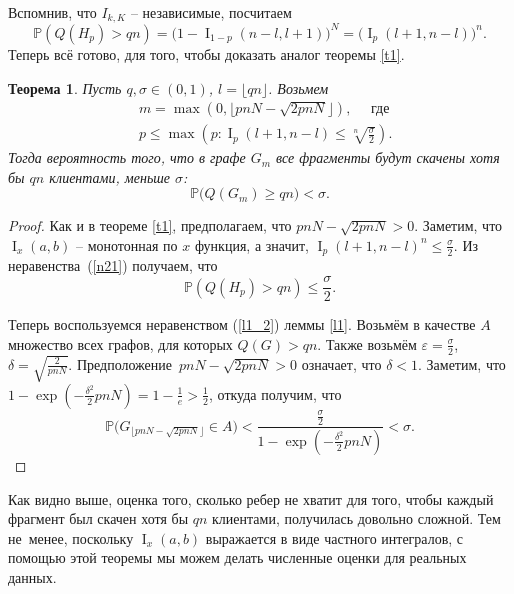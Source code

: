 \documentclass{matmex-diploma-custom}
\newcommand{\PRob}{\mathbb P}
\newcommand{\leqs}{\leqslant}
\newcommand{\geqs}{\geqslant}
\newcommand{\eps}{\varepsilon}
\DeclareMathOperator{\I}{I}
\newtheorem{theorem}{Теорема}
\theoremstyle{named}
\begin{document}
Вспомнив, что $I_{k,K}$ -- независимые, посчитаем
\begin{equation}\label{n21}
\PRob(Q(H_p) > qn) = \big(1 - \I_{1-p}(n-l, l+1)\big)^N = \big(\I_{p}(l+1, n-l)\big)^n.
\end{equation}
Теперь всё готово, для того, чтобы доказать аналог теоремы \ref{t1}.

\begin{theorem}\label{t2}
Пусть $q, \sigma \in (0, 1)$, $l = \lfloor qn \rfloor$. Возьмем 
\begin{align}
& m = \max(0, \lfloor pnN - \sqrt{2pnN} \rfloor), \quad \text{ где} \\
& p \leqs \max\left(p :  \I_p(l+1, n-l) \leqs \sqrt[n]{\frac\sigma{2}} \right).
\end{align}
Тогда вероятность того, что в графе $G_m$ все фрагменты будут скачены хотя бы $qn$ клиентами, меньше $\sigma$:
\begin{equation}
\PRob\big(Q(G_m) \geqs qn\big) < \sigma.
\end{equation}
\end{theorem}


\begin{proof}
Как и в теореме \ref{t1}, предполагаем, что $pnN - \sqrt{2pnN} > 0$.
Заметим, что $\I_x(a,b)$ -- монотонная по $x$ функция, а значит, $\I_p(l+1, n-l)^n \leqs \frac\sigma{2}$. 
Из неравенства~(\ref{n21}) получаем, что
\begin{equation}
\PRob(Q(H_p) > qn) \leqs \frac\sigma{2}.
\end{equation}

Теперь воспользуемся неравенством (\ref{l1_2}) леммы \ref{l1}.
Возьмём в качестве $A$ множество всех графов, для которых $Q(G) > qn$.
Также возьмём $\eps = \frac\sigma{2}$, $\delta = \sqrt{\frac{2}{pnN}}$.
Предположение~$pnN - \sqrt{2pnN} > 0$ означает, что $\delta < 1$.
Заметим, что $1 - \exp\left(-\frac{\delta^2}{2}pnN\right) = 1 - \frac{1}{e} > \frac{1}{2}$, откуда получим, что
\begin{equation}
\PRob\big(G_{\lfloor pnN - \sqrt{2pnN} \rfloor} \in A\big) 
	< 
\frac{\frac\sigma{2}}{1 - \exp\left(-\frac{\delta^2}{2}pnN\right)}
	<
\sigma.
\end{equation}
\end{proof}

Как видно выше, оценка того, сколько ребер не хватит для того, 
чтобы каждый фрагмент был скачен хотя бы $qn$ клиентами, получилась довольно сложной.
Тем не~менее, поскольку $\I_x(a, b)$ выражается в виде частного интегралов, 
с помощью этой теоремы мы можем делать численные оценки для реальных данных.
\end{document}
